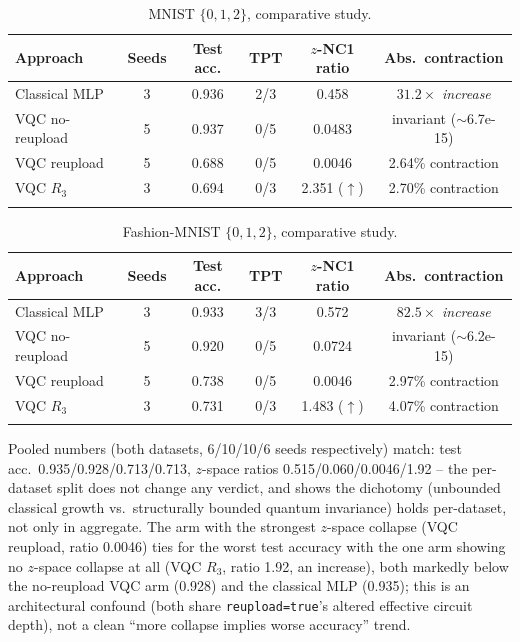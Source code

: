 \documentclass[pdflatex,sn-mathphys-ay]{sn-jnl}
\theoremstyle{thmstyleone}
\theoremstyle{thmstyletwo}
\begin{document}
\begin{table}[t]
\centering
\caption{MNIST $\{0,1,2\}$, comparative study.}
\label{tab:mnist}
\begin{tabular}{@{}lccccc@{}}
\toprule
Approach & Seeds & Test acc. & TPT & $z$-NC1 ratio & Abs.\ contraction \\
\midrule
Classical MLP & 3 & 0.936 & 2/3 & 0.458 & $31.2\times$ \emph{increase} \\
VQC no-reupload & 5 & 0.937 & 0/5 & 0.0483 & invariant ($\sim$6.7e-15) \\
VQC reupload & 5 & 0.688 & 0/5 & 0.0046 & 2.64\% contraction \\
VQC $R_3$ & 3 & 0.694 & 0/3 & 2.351 ($\uparrow$) & 2.70\% contraction \\
\botrule
\end{tabular}
\end{table}

\begin{table}[t]
\centering
\caption{Fashion-MNIST $\{0,1,2\}$, comparative study.}
\label{tab:fmnist}
\begin{tabular}{@{}lccccc@{}}
\toprule
Approach & Seeds & Test acc. & TPT & $z$-NC1 ratio & Abs.\ contraction \\
\midrule
Classical MLP & 3 & 0.933 & 3/3 & 0.572 & $82.5\times$ \emph{increase} \\
VQC no-reupload & 5 & 0.920 & 0/5 & 0.0724 & invariant ($\sim$6.2e-15) \\
VQC reupload & 5 & 0.738 & 0/5 & 0.0046 & 2.97\% contraction \\
VQC $R_3$ & 3 & 0.731 & 0/3 & 1.483 ($\uparrow$) & 4.07\% contraction \\
\botrule
\end{tabular}
\end{table}

Pooled numbers (both datasets, 6/10/10/6 seeds respectively) match: test acc.\ 0.935/0.928/0.713/0.713, $z$-space ratios 0.515/0.060/0.0046/1.92 -- the per-dataset split does not change any verdict, and shows the dichotomy (unbounded classical growth vs.\ structurally bounded quantum invariance) holds per-dataset, not only in aggregate. The arm with the strongest $z$-space collapse (VQC reupload, ratio 0.0046) ties for the worst test accuracy with the one arm showing no $z$-space collapse at all (VQC $R_3$, ratio 1.92, an increase), both markedly below the no-reupload VQC arm (0.928) and the classical MLP (0.935); this is an architectural confound (both share \texttt{reupload=true}'s altered effective circuit depth), not a clean ``more collapse implies worse accuracy'' trend.
\end{document}
